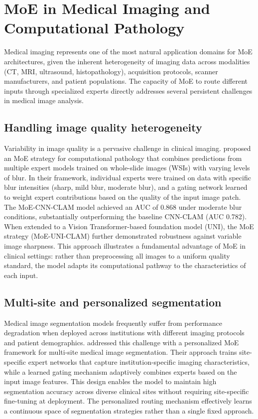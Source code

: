 
\section*{MoE in Medical Imaging and Computational Pathology}

Medical imaging represents one of the most natural application domains for MoE architectures, given the inherent heterogeneity of imaging data across modalities (CT, MRI, ultrasound, histopathology), acquisition protocols, scanner manufacturers, and patient populations. The capacity of MoE to route different inputs through specialized experts directly addresses several persistent challenges in medical image analysis.

\subsection*{Handling image quality heterogeneity}

Variability in image quality is a pervasive challenge in clinical imaging. \cite{xie2024moe_pathology} proposed an MoE strategy for computational pathology that combines predictions from multiple expert models trained on whole-slide images (WSIs) with varying levels of blur. In their framework, individual experts were trained on data with specific blur intensities (sharp, mild blur, moderate blur), and a gating network learned to weight expert contributions based on the quality of the input image patch. The MoE-CNN-CLAM model achieved an AUC of 0.868 under moderate blur conditions, substantially outperforming the baseline CNN-CLAM (AUC 0.782). When extended to a Vision Transformer-based foundation model (UNI), the MoE strategy (MoE-UNI-CLAM) further demonstrated robustness against variable image sharpness. This approach illustrates a fundamental advantage of MoE in clinical settings: rather than preprocessing all images to a uniform quality standard, the model adapts its computational pathway to the characteristics of each input.

\subsection*{Multi-site and personalized segmentation}

Medical image segmentation models frequently suffer from performance degradation when deployed across institutions with different imaging protocols and patient demographics. \cite{rahman2025personalized_moe} addressed this challenge with a personalized MoE framework for multi-site medical image segmentation. Their approach trains site-specific expert networks that capture institution-specific imaging characteristics, while a learned gating mechanism adaptively combines experts based on the input image features. This design enables the model to maintain high segmentation accuracy across diverse clinical sites without requiring site-specific fine-tuning at deployment. The personalized routing mechanism effectively learns a continuous space of segmentation strategies rather than a single fixed approach.

